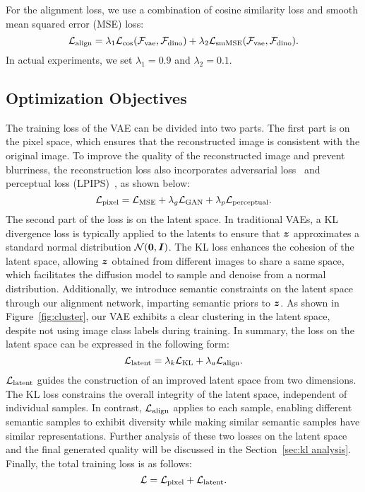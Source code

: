 For the alignment loss, we use a combination of cosine similarity loss and smooth mean squared error (MSE) loss:
\begin{equation}
{\mathcal{L}}_{\text{align}} = \lambda_1 {\mathcal{L}}_{\text{cos}}(\mathcal F_{\text{vae}}, \mathcal F_{\text{dino}}) + \lambda_2 {\mathcal{L}}_{\text{smMSE}}(\mathcal F_{\text{vae}}, \mathcal F_{\text{dino}}) .
\end{equation}
In actual experiments, we set $\lambda_1=0.9$ and $\lambda_2=0.1$.

\subsection{Optimization Objectives}
\label{sec:loss}
The training loss of the VAE can be divided into two parts. The first part is on the pixel space, which ensures that the reconstructed image is consistent with the original image. To improve the quality of the reconstructed image and prevent blurriness, the reconstruction loss also incorporates adversarial loss~\cite{creswell2018generative} and perceptual loss (LPIPS)~\cite{rad2019srobb}, as shown below:
\begin{equation}
{\mathcal{L}}_{\text{pixel}} = {\mathcal{L}}_{\text{MSE}} + \lambda_g {\mathcal{L}}_{\text{GAN}} + \lambda_p {\mathcal{L}}_{\text{perceptual}} .
\end{equation}
The second part of the loss is on the latent space. In traditional VAEs, a KL divergence loss is typically applied to the latents to ensure that \({\bm{z}}\) approximates a standard normal distribution \(\mathcal{N}(\mathbf{0},{\bm{I}})\). The KL loss enhances the cohesion of the latent space, allowing \({\bm{z}}\) obtained from different images to share a same space, which facilitates the diffusion model to sample and denoise from a normal distribution. Additionally, we introduce semantic constraints on the latent space through our alignment network, imparting semantic priors to ${\bm{z}}$. As shown in Figure~\ref{fig:cluster}, our VAE exhibits a clear clustering in the latent space, despite not using image class labels during training. In summary, the loss on the latent space can be expressed in the following form:
\begin{equation}
{\mathcal{L}}_{\text{latent}} = \lambda_{k} {\mathcal{L}}_{\text{KL}} + \lambda_{a} {\mathcal{L}}_{\text{align}} .
\label{equ:latent loss}
\end{equation}
\({\mathcal{L}}_{\text{latent}}\) guides the construction of an improved latent space from two dimensions. The KL loss constrains the overall integrity of the latent space, independent of individual samples. In contrast, \({\mathcal{L}}_{\text{align}}\) applies to each sample, enabling different semantic samples to exhibit diversity while making similar semantic samples have similar representations. Further analysis of these two losses on the latent space and the final generated quality will be discussed in the Section~\ref{sec:kl analysis}.
Finally, the total training loss is as follows:
\begin{equation}
{\mathcal{L}} = {\mathcal{L}}_{\text{pixel}} + {\mathcal{L}}_{\text{latent}} .
\end{equation}

